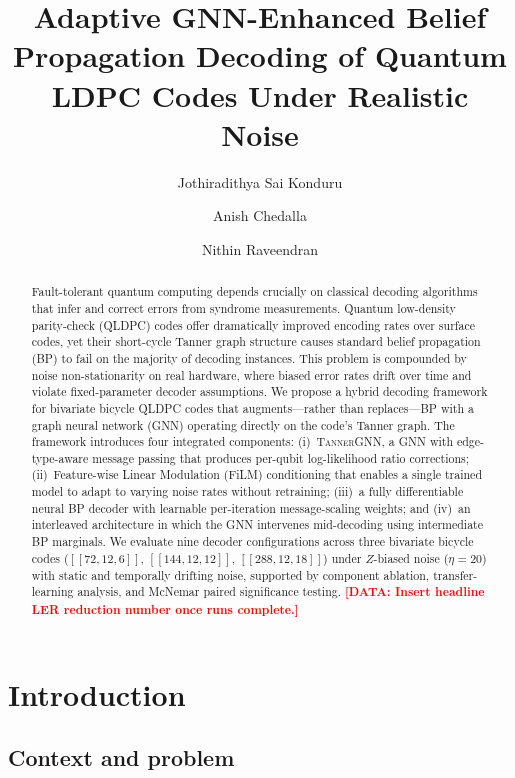 \documentclass[a4paper,twocolumn,11pt,unpublished,nopdfoutputerror]{quantumarticle}
\title{Adaptive GNN-Enhanced Belief Propagation Decoding of Quantum LDPC Codes Under Realistic Noise}
\author{Jothiradithya Sai Konduru}
\affiliation{Paradise Valley High School, Phoenix, AZ, USA}
\author{Anish Chedalla}
\affiliation{Paradise Valley High School, Phoenix, AZ, USA}
\author{Nithin Raveendran}
\affiliation{Department of Electrical and Computer Engineering, University of Arizona, Tucson, AZ, USA}
\newcommand{\code}[3]{\ensuremath{[\![#1,#2,#3]\!]}}
\newcommand{\pending}[1]{\textcolor{red}{\textbf{[#1]}}}
\begin{document}
\maketitle

\begin{abstract}
Fault-tolerant quantum computing depends crucially on classical decoding algorithms that infer and correct errors from syndrome measurements. Quantum low-density parity-check (QLDPC) codes offer dramatically improved encoding rates over surface codes, yet their short-cycle Tanner graph structure causes standard belief propagation (BP) to fail on the majority of decoding instances. This problem is compounded by noise non-stationarity on real hardware, where biased error rates drift over time and violate fixed-parameter decoder assumptions. We propose a hybrid decoding framework for bivariate bicycle QLDPC codes that augments---rather than replaces---BP with a graph neural network (GNN) operating directly on the code's Tanner graph. The framework introduces four integrated components: (i)~\textsc{TannerGNN}, a GNN with edge-type-aware message passing that produces per-qubit log-likelihood ratio corrections; (ii)~Feature-wise Linear Modulation (FiLM) conditioning that enables a single trained model to adapt to varying noise rates without retraining; (iii)~a fully differentiable neural BP decoder with learnable per-iteration message-scaling weights; and (iv)~an interleaved architecture in which the GNN intervenes mid-decoding using intermediate BP marginals. We evaluate nine decoder configurations across three bivariate bicycle codes ($\code{72}{12}{6}$, $\code{144}{12}{12}$, $\code{288}{12}{18}$) under $Z$-biased noise ($\eta=20$) with static and temporally drifting noise, supported by component ablation, transfer-learning analysis, and McNemar paired significance testing. \pending{DATA: Insert headline LER reduction number once runs complete.}
\end{abstract}


\section{Introduction}

\subsection{Context and problem}
\end{document}
